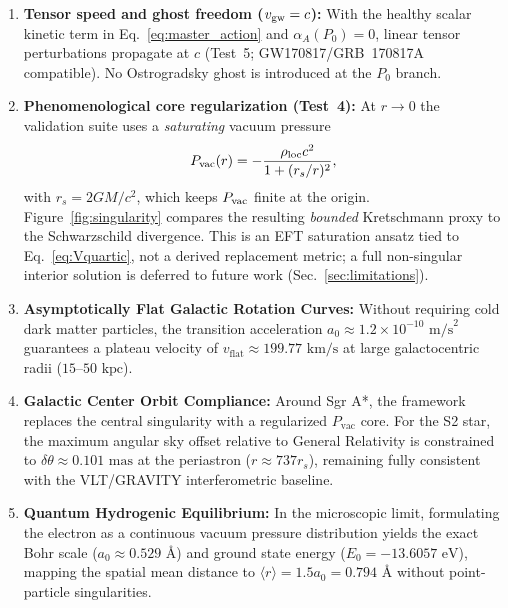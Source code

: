 \documentclass[prd,
               reprint,
               aps,
               preprintnumbers,
               nofootinbib,
               longbibliography,
               floatfix]{revtex4-2}
\begin{document}
\begin{enumerate}
    \item \textbf{Tensor speed and ghost freedom ($v_{\rm gw}=c$):}
    With the healthy scalar kinetic term in Eq.~\eqref{eq:master_action}
    and $\alpha_A(P_0)=0$, linear tensor perturbations propagate at $c$
    (Test~5; GW170817/GRB~170817A compatible).
    No Ostrogradsky ghost is introduced at the $P_0$ branch.
    \item \textbf{Phenomenological core regularization (Test~4):}
    At $r\to 0$ the validation suite uses a \emph{saturating} vacuum
    pressure
    \begin{equation}
    \label{eq:Pvac_sat}
    P_{\rm vac}(r)
    =
    -\frac{\rho_{\rm loc} c^2}{1+(r_s/r)^2},
    \end{equation}
    with $r_s=2GM/c^2$, which keeps $P_{\rm vac}$ finite at the origin.
    Figure~\ref{fig:singularity} compares the resulting \emph{bounded}
    Kretschmann proxy to the Schwarzschild divergence.
    This is an EFT saturation ansatz tied to Eq.~\eqref{eq:Vquartic}, not
    a derived replacement metric; a full non-singular interior solution
    is deferred to future work (Sec.~\ref{sec:limitations}).
    \item \textbf{Asymptotically Flat Galactic Rotation Curves:}
    Without requiring cold dark matter particles, the transition
    acceleration $a_0 \approx 1.2 \times 10^{-10}\text{ m/s}^2$
    guarantees a plateau velocity of $v_{\text{flat}} \approx
    199.77\text{ km/s}$ at large galactocentric radii ($15\text{--}%
    50\text{ kpc}$).
    \item \textbf{Galactic Center Orbit Compliance:} 
    Around Sgr A*, the framework replaces the central singularity 
    with a regularized $P_{\text{vac}}$ core. For the S2 star, 
    the maximum angular sky offset relative to General Relativity 
    is constrained to $\delta \theta \approx 0.101\text{ mas}$ 
    at the periastron ($r \approx 737 r_s$), remaining fully 
    consistent with the VLT/GRAVITY interferometric baseline.
    \item \textbf{Quantum Hydrogenic Equilibrium:} 
    In the microscopic limit, formulating the electron as a continuous 
    vacuum pressure distribution yields the exact Bohr scale ($a_0 
    \approx 0.529\text{ \AA}$) and ground state energy ($E_0 = 
    -13.6057\text{ eV}$), mapping the spatial mean distance to 
    $\langle r \rangle = 1.5 a_0 = 0.794\text{ \AA}$ without point-particle 
    singularities.
\end{enumerate}
\end{document}
